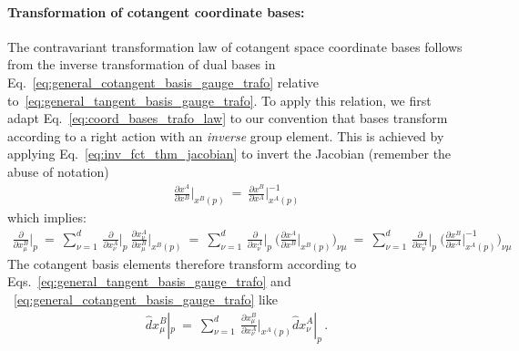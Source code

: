 \paragraph{Transformation of cotangent coordinate bases:}
The contravariant transformation law of cotangent space coordinate bases follows from the inverse transformation of dual bases in Eq.~\eqref{eq:general_cotangent_basis_gauge_trafo} relative to~\eqref{eq:general_tangent_basis_gauge_trafo}.
To apply this relation, we first adapt Eq.~\eqref{eq:coord_bases_trafo_law} to our convention that bases transform according to a right action with an \emph{inverse} group element.
This is achieved by applying Eq.~\eqref{eq:inv_fct_thm_jacobian} to invert the Jacobian (remember the abuse of notation)
\begin{align}
    \frac{\partial x^A}{\partial x^B} \bigg|_{x^B(p)} \ =\ 
    \frac{\partial x^B}{\partial x^A} \bigg|_{x^A(p)}^{-1}
\end{align}
which implies:
\begin{align}\label{eq:coord_bases_trafo_law_with_inv}
    \frac{\partial}{\partial x^B_\mu} \bigg|_p
    \ =\ \sum_{\nu=1}^d \,
        \frac{\partial}{\partial x^A_\nu} \bigg|_p \ 
        \frac{\partial x^A_\nu}{\partial x^B_\mu} \bigg|_{x^B(p)}
    \ =\ \sum_{\nu=1}^d \,
        \frac{\partial}{\partial x^A_\nu} \bigg|_p \ 
        \bigg( \frac{\partial x^A}{\partial x^B} \bigg|_{x^B(p)} \bigg)_{\nu\mu}
    \ =\ \sum_{\nu=1}^d \,
        \frac{\partial}{\partial x^A_\nu} \bigg|_p \ 
        \bigg( \frac{\partial x^B}{\partial x^A} \bigg|_{x^A(p)}^{-1} \bigg)_{\nu\mu}
\end{align}
The cotangent basis elements therefore transform according to Eqs.~\eqref{eq:general_tangent_basis_gauge_trafo} and ~\eqref{eq:general_cotangent_basis_gauge_trafo} like
\begin{align}\label{eq:chart_component_gradient_trafo_law}
    \hat{d}x^B_\mu|_p \ =\ 
    \sum_{\nu=1}^d\ 
        \frac{\partial x^B_\mu}{\partial x^A_\nu} \bigg|_{x^A(p)}
        \hat{d}x^A_\nu|_p \,.
\end{align}




